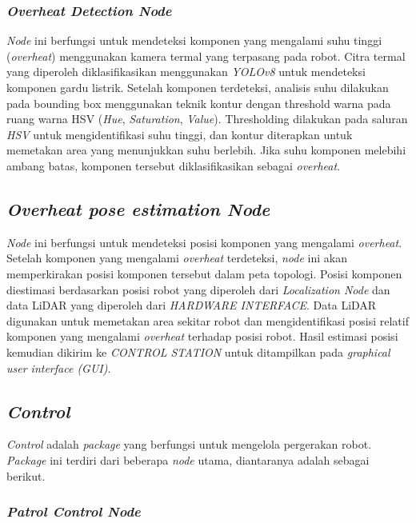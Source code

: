 \subsubsection{\emph{Overheat Detection Node}}
\emph{Node} ini berfungsi untuk mendeteksi komponen yang mengalami suhu tinggi (\emph{overheat}) menggunakan kamera termal yang terpasang pada robot. Citra termal yang diperoleh diklasifikasikan menggunakan \emph{YOLOv8} untuk mendeteksi komponen gardu listrik. Setelah komponen terdeteksi, analisis suhu dilakukan pada bounding box menggunakan teknik kontur dengan threshold warna pada ruang warna HSV (\emph{Hue}, \emph{Saturation}, \emph{Value}). Thresholding dilakukan pada saluran \emph{HSV} untuk mengidentifikasi suhu tinggi, dan kontur diterapkan untuk memetakan area yang menunjukkan suhu berlebih. Jika suhu komponen melebihi ambang batas, komponen tersebut diklasifikasikan sebagai \emph{overheat}.

\subsection{\emph{Overheat pose estimation Node}}
\emph{Node} ini berfungsi untuk mendeteksi posisi komponen yang mengalami \emph{overheat}. Setelah komponen yang mengalami \emph{overheat} terdeteksi, \emph{node} ini akan memperkirakan posisi komponen tersebut dalam peta topologi. Posisi komponen diestimasi berdasarkan posisi robot yang diperoleh dari \emph{Localization Node} dan data LiDAR yang diperoleh dari \emph{HARDWARE INTERFACE}. Data LiDAR digunakan untuk memetakan area sekitar robot dan mengidentifikasi posisi relatif komponen yang mengalami \emph{overheat} terhadap posisi robot. Hasil estimasi posisi kemudian dikirim ke \emph{CONTROL STATION} untuk ditampilkan pada \emph{graphical user interface (GUI)}.

\subsection{\emph{Control}}
\emph{Control} adalah \emph{package} yang berfungsi untuk mengelola pergerakan robot. \emph{Package} ini terdiri dari beberapa \emph{node} utama, diantaranya adalah sebagai berikut.

\subsubsection{\emph{Patrol Control Node}}

